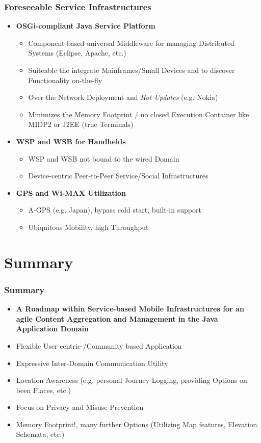 \documentclass[blue]{beamer}
\begin{document}
\frame
{
\frametitle{\textbf{Foreseeable Service Infrastructures}}
\begin{itemize}
\item \textbf{OSGi-compliant Java Service Platform}
  \begin{itemize}
    \item Component-based universal Middleware for managing Distributed Systems (Eclipse, Apache, etc.)
    \item Suiteable the integrate Mainframes/Small Devices and to discover Functionality on-the-fly
    \item Over the Network Deployment and \textit{Hot Updates} (e.g. Nokia)
    \item Minimizes the Memory Footprint / no closed Execution Container like MIDP2 or J2EE (true Terminals)
  \end{itemize}
\item \textbf{WSP and WSB for Handhelds}
  \begin{itemize}
    \item WSP and WSB not bound to the wired Domain
    \item Device-centric Peer-to-Peer Service/Social Infrastructures
  \end{itemize}
\item \textbf{GPS and Wi-MAX Utilization}
  \begin{itemize}
    \item A-GPS (e.g. Japan), bypass cold start, built-in support
    \item Ubiquitous Mobility, high Throughput
  \end{itemize}
\end{itemize}
}




\section*{Summary}
\frame
{
\frametitle{\textbf{Summary}}
\begin{itemize}
\item \textbf{A Roadmap within Service-based Mobile Infrastructures for an agile Content Aggregation and Management in the Java Application Domain}
\item Flexible User-centric-/Community based Application
\item Expressive Inter-Domain Communication Utility 
\item Location Awareness (e.g. personal Journey Logging, providing Options on been Places, etc.)
\item Focus on Privacy and Misuse Prevention
\item Memory Footprint!, many further Options (Utilizing Map features, Elevation Schemata, etc.)
\end{itemize}
}
\end{document}
